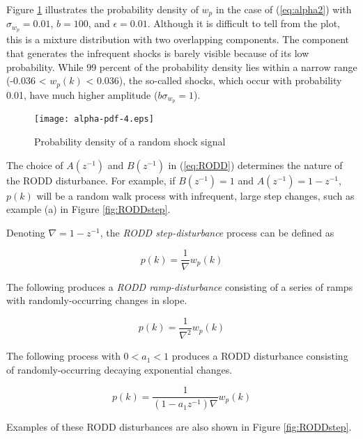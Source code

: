 Figure \ref{fig:alpha-pdf} illustrates the probability density of $w_p$ in the case of (\ref{eq:alpha2}) with $\sigma_{w_p}=0.01$, $b=100$, and $\epsilon=0.01$. Although it is difficult to tell from the plot, this is a mixture distribution with two overlapping components. The component that generates the infrequent shocks is barely visible because of its low probability. While 99 percent of the probability density lies within a narrow range (-0.036 < $w_p(k)$ < 0.036), the so-called shocks, which occur with probability 0.01, have much higher amplitude ($b\sigma_{w_p}=1$).

\begin{figure}[htp] \label{fig:alpha-pdf}
	\centering
	\texttt{[image: alpha-pdf-4.eps]}
	\caption{Probability density of a random shock signal}
\end{figure}

The choice of $A(z^{-1})$ and $B(z^{-1})$ in (\ref{eq:RODD}) determines the nature of the RODD disturbance. For example, if $B(z^{-1})=1$ and $A(z^{-1})=1-z^{-1}$, $p(k)$ will be a random walk process with infrequent, large step changes, such as example (a) in Figure \ref{fig:RODDstep}.

\begin{figure}[htp] \label{fig:RODD-examples}
\end{figure}

Denoting $\nabla=1-z^{-1}$, the \textit{RODD step-disturbance} process can be defined as

\begin{equation} \label{eq:RODD-step}
	p(k)= \frac{1}{\nabla}w_p(k)
\end{equation}

The following produces a \textit{RODD ramp-disturbance} consisting of a series of ramps with randomly-occurring changes in slope.

\begin{equation} \label{eq:RODD-ramp}
	p(k)= \frac{1}{\nabla^2}w_p(k)
\end{equation}

The following process with $0<a_1<1$ produces a RODD disturbance consisting of randomly-occurring decaying exponential changes.

\begin{equation} \label{eq:RODD-exp}
	p(k)= \frac{1}{(1-a_1z^{-1})\nabla}w_p(k)
\end{equation}

Examples of these RODD disturbances are also shown in Figure \ref{fig:RODDstep}.


